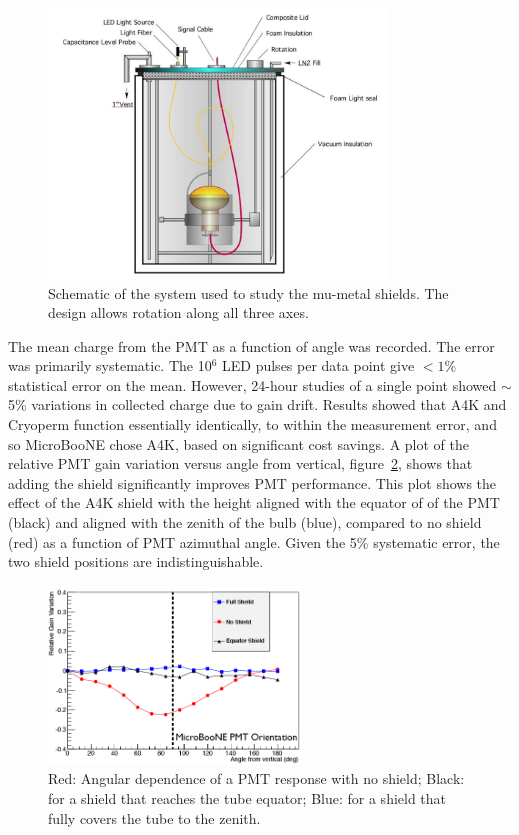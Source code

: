\begin{figure}
\centering 
\includegraphics[width=0.8\textwidth]{./figures/KendzioraRotator.jpg}
\caption{Schematic of the system used to study the mu-metal shields.  The design allows rotation along all three axes. \label{fig:shieldcartoon}  }
\end{figure}


The mean charge from the PMT as a function of angle was recorded.  The error was primarily systematic.   The 10$^6$ LED pulses per data point give $<1\%$ statistical error on the mean.  However, 24-hour studies of a single point showed $\sim$5\% variations in collected charge due to gain drift.  Results showed that A4K and Cryoperm function essentially identically, to within the measurement error, and so MicroBooNE chose A4K, based on significant cost savings.    A plot of the relative PMT gain variation versus angle from vertical, figure~\ref{fig:shield}, shows that adding the shield significantly improves PMT performance.  This plot shows the effect of the A4K shield with the height aligned with the equator of of the PMT (black) and aligned with the zenith of the bulb (blue), compared to no shield (red) as a function of PMT azimuthal angle.  Given the 5\% systematic error, the two shield positions are indistinguishable.  

\begin{figure}
\centering 
\includegraphics[width=0.6\textwidth]{./figures/shield.png}
\caption{Red:  Angular dependence of a PMT response with no shield;  Black:  for a shield that reaches the tube equator;  Blue: for a shield that fully covers the tube to the zenith. \label{fig:shield}  }
\end{figure}



